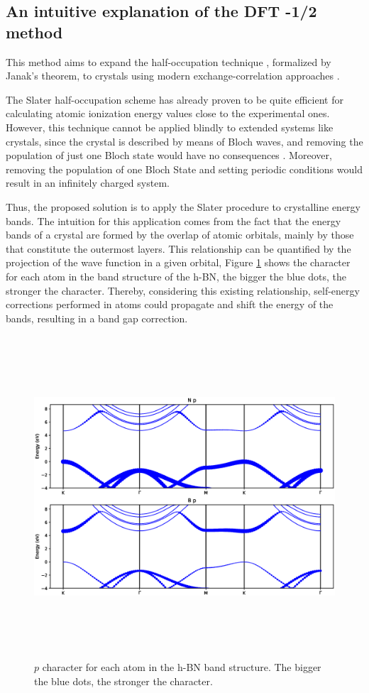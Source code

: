 \subsection{An intuitive explanation of the DFT -1/2 method}
This method aims to expand the half-occupation technique \cite{PhysRevB.5.844}\cite{SLATER19721}, formalized by Janak’s theorem, to crystals using modern exchange-correlation approaches \cite{PhysRevB.23.5048} \cite{PhysRevLett.77.3865}.

The Slater half-occupation scheme has already proven to be quite efficient for calculating atomic ionization energy values close to the experimental ones. However, this technique cannot be applied blindly to extended systems like crystals, since the crystal is described by means of Bloch waves, and removing the population of just one Bloch state would have no consequences \cite{PhysRevB.78.125116}. Moreover, removing the population of one Bloch State and setting periodic conditions would result in an infinitely charged system.

Thus, the proposed solution is to apply the Slater procedure to crystalline energy bands. The intuition for this application comes from the fact that the energy bands of a crystal are formed by the overlap of atomic orbitals, mainly by those that constitute the outermost layers. This relationship can be quantified by the projection of the wave function in a given orbital, Figure \ref{bs_BN} shows the character for each atom in the band structure of the h-BN, the bigger the blue dots, the stronger the character. Thereby, considering this existing relationship, self-energy corrections performed in atoms could propagate and shift the energy of the bands, resulting in a band gap correction.

\begin{figure}[!ht]
        \centering
        \includegraphics[width=15cm,height=12cm]{images/bands.eps}
        \caption{$p$ character for each atom in the h-BN band structure. The bigger the blue dots, the stronger the character.}
        \label{bs_BN}
\end{figure}

